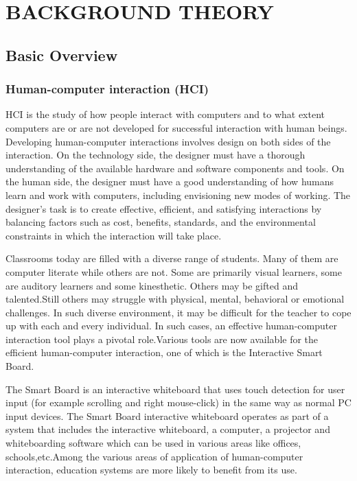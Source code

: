 \documentclass[12pt, a4paper]{article}
\begin{document}
\newpage
\section{BACKGROUND THEORY}
\subsection{Basic Overview}
\subsubsection{Human-computer interaction (HCI)} 
HCI is the study of how people interact with computers and to what extent computers are or are not developed for successful interaction with human beings. Developing human-computer interactions involves design on both sides of the interaction. On the technology side, the designer must have a thorough understanding of the available hardware and software components and tools. On the human side, the designer must have a good understanding of how humans learn and work with computers, including envisioning new modes of working. The designer's task is to create effective, efficient, and satisfying interactions by balancing factors such as cost, benefits, standards, and the environmental constraints in which the interaction will take place. 

Classrooms today are filled with a diverse range of students. Many of them are computer literate while others are not. Some are primarily visual learners, some are auditory learners and some kinesthetic. Others may be gifted and talented.Still others may struggle with physical, mental, behavioral or emotional challenges. In such diverse environment, it may be difficult for the teacher to cope up with each and every individual. In such cases, an effective human-computer interaction tool plays a pivotal role.Various tools are now available for the efficient human-computer interaction, one of which is the Interactive Smart Board.

The Smart Board is an interactive whiteboard that uses touch detection for user input (for example scrolling and right mouse-click) in the same way as normal PC input devices. The Smart Board interactive whiteboard operates as part of a system that includes the interactive whiteboard, a computer, a projector and whiteboarding software which can be used in various areas like offices, schools,etc.Among the various areas of application of human-computer interaction, education systems are more likely to benefit from its use.
\end{document}

